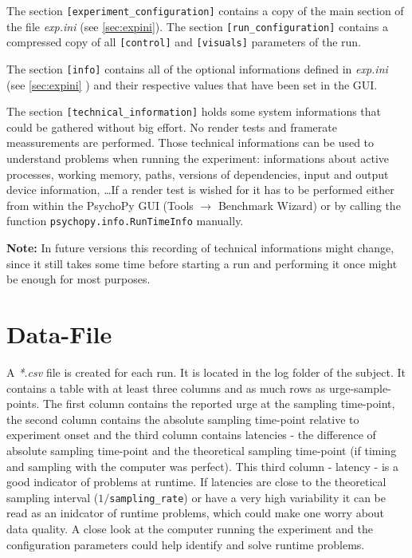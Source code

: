 \documentclass[12pt,a4paper]{book}
\begin{document}
The section \verb|[experiment_configuration]| contains a copy of the main section of the file \textit{exp.ini} (see \ref{sec:expini}). The section \verb|[run_configuration]| contains a compressed copy of all \verb|[control]| and \verb|[visuals]| parameters of the run.

The section \verb|[info]| contains all of the optional informations defined in \textit{exp.ini} (see \ref{sec:expini} ) and their respective values that have been set in the GUI.

The section \verb|[technical_information]| holds some system informations that could be gathered without big effort. No render tests and framerate meassurements are performed. Those technical informations can be used to understand problems when running the experiment: informations about active processes, working memory, paths, versions of dependencies, input and output device information, \dots If a render test is wished for it has to be performed either from within the PsychoPy GUI (Tools $\rightarrow$ Benchmark Wizard) or by calling the function \verb|psychopy.info.RunTimeInfo| manually.

\textbf{Note:} In future versions this recording of technical informations might change, since it still takes some time before starting a run and performing it once might be enough for most purposes.

\section{Data-File}

A \textit{*.csv} file is created for each run. It is located in the log folder of the subject. It contains a table with at least three columns and as much rows as urge-sample-points. The first column contains the reported urge at the sampling time-point, the second column contains the absolute sampling time-point relative to experiment onset and the third column contains latencies - the difference of absolute sampling time-point and the theoretical sampling time-point (if timing and sampling with the computer was perfect). This third column - latency - is a good indicator of problems at runtime. If latencies are close to the theoretical sampling interval ($1 / $\verb|sampling_rate|) or have a very high variability it can be read as an inidcator of runtime problems, which could make one worry about data quality. A close look at the computer running the experiment and the configuration parameters could help identify and solve runtime problems. 
\end{document}
